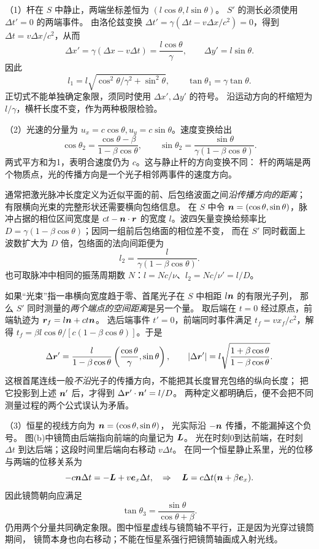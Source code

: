 \begin{advsolution}
（1）杆在 $S$ 中静止，两端坐标差恒为 $(l\cos\theta,l\sin\theta)$。
$S'$ 的测长必须使用 $\Delta t'=0$ 的两端事件。
由洛伦兹变换 $\Delta t'=\gamma(\Delta t-v\Delta x/c^2)=0$，得到
$\Delta t=v\Delta x/c^2$，从而
\[
 \Delta x'=\gamma(\Delta x-v\Delta t)=\frac{l\cos\theta}{\gamma},
 \qquad \Delta y'=l\sin\theta.
\]
因此
\[
 \boxed{l_1=l\sqrt{\cos^2\theta/\gamma^2+\sin^2\theta}},\qquad
 \boxed{\tan\theta_1=\gamma\tan\theta}.
\]
正切式不能单独确定象限，须同时使用 $\Delta x',\Delta y'$ 的符号。
沿运动方向的杆缩短为 $l/\gamma$，横杆长度不变，作为两种极限检验。

（2）光速的分量为 $u_x=c\cos\theta,u_y=c\sin\theta$。速度变换给出
\[
 \boxed{\cos\theta_2=\frac{\cos\theta-\beta}{1-\beta\cos\theta}},\qquad
 \boxed{\sin\theta_2=\frac{\sin\theta}{\gamma(1-\beta\cos\theta)}}.
\]
两式平方和为1，表明合速度仍为 $c$。这与静止杆的方向变换不同：
杆的两端是两个物质点，光的传播方向是一个光子相邻两事件的速度方向。

通常把激光脉冲长度定义为近似平面的前、后包络波面之间\emph{沿传播方向的距离}；
有限横向光束的完整形状还需要横向包络信息。
在 $S$ 中令 $\bm{n}=(\cos\theta,\sin\theta)$，脉冲占据的相位区间宽度是
$c t-\bm{n}\cdot\bm{r}$ 的宽度 $l$。波四矢量变换给频率比
$D=\gamma(1-\beta\cos\theta)$；因同一组前后包络面的相位差不变，
而在 $S'$ 同时截面上波数扩大为 $D$ 倍，包络面的法向间距便为
\[
 \boxed{l_2=\frac{l}{\gamma(1-\beta\cos\theta)}}.
\]
也可取脉冲中相同的振荡周期数 $N$：$l=Nc/\nu$、$l_2=Nc/\nu'=l/D$。

如果“光束”指一串横向宽度趋于零、首尾光子在 $S$ 中相距 $l\bm{n}$ 的有限光子列，
那么 $S'$ 同时测量的\emph{两个端点的空间距离}是另一个量。
取后端在 $t=0$ 经过原点，前端轨迹为 $\bm{r}_f=l\bm{n}+c t\bm{n}$。
选后端事件 $t'=0$，前端同时事件满足
$t_f=v x_f/c^2$，解得 $t_f=\beta l\cos\theta/[c(1-\beta\cos\theta)]$。于是
\[
 \Delta\bm{r}'=
 \frac{l}{1-\beta\cos\theta}\left(\frac{\cos\theta}{\gamma},\sin\theta\right),
 \qquad
 |\Delta\bm{r}'|=l\sqrt{\frac{1+\beta\cos\theta}{1-\beta\cos\theta}}.
\]
这根首尾连线一般\emph{不沿}光子的传播方向，不能把其长度冒充包络的纵向长度；
把它投影到上述 $\bm{n}'$ 后，才得到 $\Delta\bm{r}'\cdot\bm{n}'=l/D$。
两种定义都明确后，便不会把不同测量过程的两个公式误认为矛盾。

（3）恒星的视线方向为 $\bm{n}=(\cos\theta,\sin\theta)$，
光实际沿 $-\bm{n}$ 传播，不能漏掉这个负号。
图(b)中镜筒由后端指向前端的向量记为 $\bm{L}$。
光在时刻0到达前端，在时刻 $\Delta t$ 到达后端；这段时间里后端向右移动 $v\Delta t$。
在同一个恒星静止系里，光的位移与两端的位移关系为
\[
 -c\bm{n}\Delta t=-\bm{L}+v\bm{e}_x\Delta t,
 \quad\Rightarrow\quad
 \bm{L}=c\Delta t(\bm{n}+\beta\bm{e}_x).
\]
因此镜筒朝向应满足
\[
 \boxed{\tan\theta_3=\frac{\sin\theta}{\cos\theta+\beta}}.
\]
仍用两个分量共同确定象限。图中恒星虚线与镜筒轴不平行，正是因为光穿过镜筒期间，
镜筒本身也向右移动；不能在恒星系强行把镜筒轴画成入射光线。


\end{advsolution}
